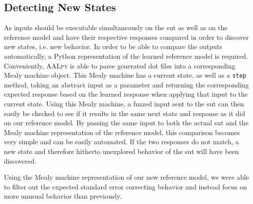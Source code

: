 \subsection{Detecting New States} \label{subsec:state_detect}
As inputs should be executable simultaneously on the \ac{sut} as well as on the reference model and have their respective responses compared in order to discover new states, i.e. new behavior. In order to be able to compare the outputs automatically, a Python representation of the learned reference model is required. Conveniently, \textsc{AALpy} is able to parse generated dot files into a corresponding Mealy machine object. This Mealy machine has a current state, as well as a \texttt{step} method, taking an abstract input as a parameter and returning the corresponding expected response based on the learned response when applying that input to the current state. Using this Mealy machine, a fuzzed input sent to the \ac{sut} can then easily be checked to see if it results in the same next state and response as it did on our reference model. By passing the same input to both the actual \ac{sut} and the Mealy machine representation of the reference model, this comparison becomes very simple and can be easily automated. If the two responses do not match, a new state and therefore hitherto unexplored behavior of the \ac{sut} will have been discovered. 

Using the Mealy machine representation of our new reference model, we were able to filter out the expected standard error correcting behavior and instead focus on more unusual behavior than previously. 

